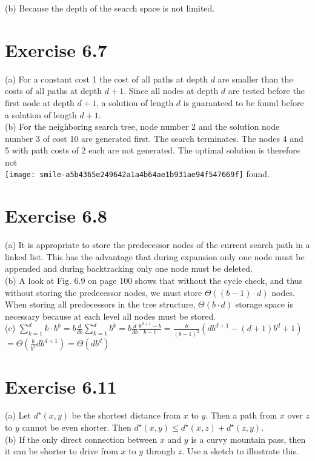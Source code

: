 \documentclass[10pt]{article}
\begin{document}
(b) Because the depth of the search space is not limited.

\section*{Exercise 6.7}
(a) For a constant cost 1 the cost of all paths at depth $d$ are smaller than the costs of all paths at depth $d+1$. Since all nodes at depth $d$ are tested before the first node at depth $d+1$, a solution of length $d$ is guaranteed to be found before a solution of length $d+1$.\\
(b) For the neighboring search tree, node number 2 and the solution node number 3 of cost 10 are generated first. The search terminates. The nodes 4 and 5 with path costs of 2 each are not generated. The optimal solution is therefore not\\
\texttt{[image: smile-a5b4365e249642a1a4b64ae1b931ae94f547669f]} found.

\section*{Exercise 6.8}
(a) It is appropriate to store the predecessor nodes of the current search path in a linked list. This has the advantage that during expansion only one node must be appended and during backtracking only one node must be deleted.\\
(b) A look at Fig. 6.9 on page 100 shows that without the cycle check, and thus without storing the predecessor nodes, we must store $\Theta((b-1) \cdot d)$ nodes. When storing all predecessors in the tree structure, $\Theta(b \cdot d)$ storage space is necessary because at each level all nodes must be stored.\\
(c) $\sum_{k=1}^{d} k \cdot b^{k}=b \frac{d}{d b} \sum_{k=1}^{d} b^{k}=b \frac{d}{d b} \frac{b^{d+1}-b}{b-1}=\frac{b}{(b-1)^{2}}\left(d b^{d+1}-(d+1) b^{d}+1\right)$ $=\Theta\left(\frac{b}{b^{2}} d b^{d+1}\right)=\Theta\left(d b^{d}\right)$

\section*{Exercise 6.11}
(a) Let $d^{\star}(x, y)$ be the shortest distance from $x$ to $y$. Then a path from $x$ over $z$ to $y$ cannot be even shorter. Then $d^{\star}(x, y) \leq d^{\star}(x, z)+d^{\star}(z, y)$.\\
(b) If the only direct connection between $x$ and $y$ is a curvy mountain pass, then it can be shorter to drive from $x$ to $y$ through $z$. Use a sketch to illustrate this.
\end{document}
